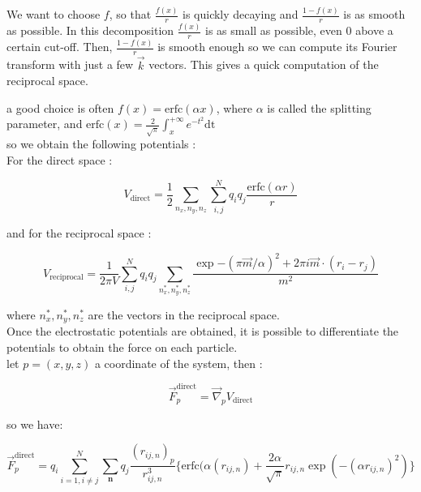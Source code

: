 \documentclass[12pt,twoside,a4paper]{report}
\begin{document}
We want to choose $f$, so that $\frac{f(x)}{r}$ is quickly decaying and $\frac{1 - f(x)}{r}$ is as smooth as possible. In this decomposition $\frac{f(x)}{r}$  is as small as possible, even $0$ above a certain cut-off. Then, $\frac{1-f(x)}{r}$ is smooth enough so we can compute its Fourier transform with just a few $\overrightarrow{k}$ vectors. This gives a quick computation of the reciprocal space.

a good choice is often $f(x) = \text{erfc}(\alpha x)$, where $\alpha$ is called the splitting parameter, and $\text{erfc}(x) = \frac{2}{\sqrt{\pi}} \int_{x}^{+\infty}{e^{-t^2}\text{dt}} $\\

so we obtain the following potentials :\\

For the direct space :

\begin{equation}
   V_{\text{direct}} =  \frac{1}{2} \sum_{n_x,n_y,n_z} \sum_{i,j}^{N} q_i q_j \frac{\text{erfc}(\alpha r)}{r}
\end{equation}

and for the reciprocal space :

\begin{equation}
\label{Vrecip}
	V_{\text{reciprocal}} = \frac{1}{2 \pi V} \sum_{i,j}^{N} q_i q_j \sum_{n_x^*,n_y^*,n_z^*}\frac{\exp{-(\pi \overrightarrow{m}/\alpha)^2} +2\pi i \overrightarrow{m} \cdot (r_i - r_j)}{m^2}
\end{equation}

where $n_x^*,n_y^*,n_z^*$ are the vectors in the reciprocal space.\\


Once the electrostatic potentials are obtained, it is possible to differentiate the potentials to obtain the force on each particle.\\

let $p = (x,y,z)$ a coordinate of the system, then :


\begin{equation}
   \overrightarrow{F}_p^{\text{direct}} = \overrightarrow{\nabla}_p V_{\text{direct}} 
\end{equation}


so we have:

\begin{equation}
\label{ewaldDirect}
   \overrightarrow{F}_p^{\text{direct}} = q_i \sum\limits_{i=1,i\neq j}^N \sum\limits_{\textbf{n}} q_j \frac{(r_{ij,n})_p}{r_{ij,n}^3}
   \{\text{erfc}(\alpha (r_{ij,n}) + \frac{2\alpha}{\sqrt{\pi}} r_{ij,n} \exp(-(\alpha r_{ij,n})^2)\}
\end{equation}
\end{document}
